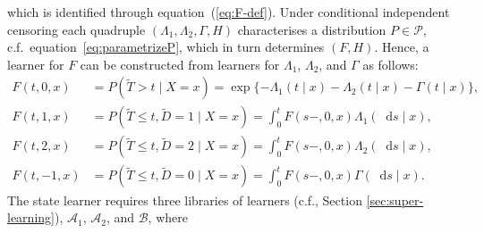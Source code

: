 \documentclass[11pt]{article}
\theoremstyle{thmstyleone}%
\theoremstyle{thmstyletwo}%
\theoremstyle{thmstylethree}%
\newcommand*\diff{\mathop{}\!\mathrm{d}}
\newcommand{\1}{\mathds{1}}
\begin{document}
which is identified through equation~(\ref{eq:F-def}). Under conditional
independent censoring each quadruple $(\Lambda_{1}, \Lambda_{2}, \Gamma, H)$
characterises a distribution \(P\in\mathcal P\), c.f.\
equation~\eqref{eq:parametrizeP}, which in turn determines \( (F, H) \). Hence,
a learner for \( F \) can be constructed from learners for \( \Lambda_1 \),
\( \Lambda_2 \), and $\Gamma$ as follows:
\begin{equation}\label{eq:transition}
  \begin{split}
    F(t, 0, x)
    &
      = P(\tilde{T} > t \mid X= x)
      =
      \exp{{\{-\Lambda_{1}(t \mid x)-\Lambda_{2}(t \mid x) - \Gamma(t \mid x)\}
      }},
    \\
    F(t, 1, x)
    &
      = P(\tilde{T} \leq t, \tilde{D}=1 \mid X=x)
      = \int_0^t F(s-, 0, x)  \Lambda_{1}(\diff s \mid x),
    \\
    F(t, 2, x)
    &
      = P(\tilde{T} \leq t, \tilde{D}=2 \mid X=x)
      = \int_0^t  F(s-, 0, x)  \Lambda_{2}(\diff s \mid x),
    \\
    F(t, -1, x)
    &
      = P(\tilde{T} \leq t, \tilde{D}=0 \mid X=x)
      = \int_0^t F(s-, 0, x)  \Gamma(\diff s \mid x).
  \end{split}
\end{equation}
The state learner requires three libraries of learners (c.f., Section \ref{sec:super-learning}),
\(\mathcal{A}_1\), \( \mathcal{A}_2 \), and \( \mathcal{B} \), where
\end{document}
